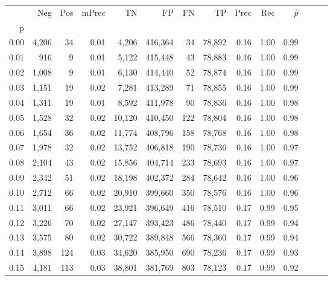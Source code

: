 \begin{tabular}{rrrrrrrrrrrrrr}
\toprule
{} &    Neg &    Pos & mPrec &       TN &       FP &      FN &      TP &  Prec &   Rec & $\hat{p}$ \\
p    &        &        &       &          &          &         &         &       &       &           \\
\midrule
0.00 &  4,206 &     34 &  0.01 &    4,206 &  416,364 &      34 &  78,892 &  0.16 &  1.00 &      0.99 \\
0.01 &    916 &      9 &  0.01 &    5,122 &  415,448 &      43 &  78,883 &  0.16 &  1.00 &      0.99 \\
0.02 &  1,008 &      9 &  0.01 &    6,130 &  414,440 &      52 &  78,874 &  0.16 &  1.00 &      0.99 \\
0.03 &  1,151 &     19 &  0.02 &    7,281 &  413,289 &      71 &  78,855 &  0.16 &  1.00 &      0.99 \\
0.04 &  1,311 &     19 &  0.01 &    8,592 &  411,978 &      90 &  78,836 &  0.16 &  1.00 &      0.98 \\
0.05 &  1,528 &     32 &  0.02 &   10,120 &  410,450 &     122 &  78,804 &  0.16 &  1.00 &      0.98 \\
0.06 &  1,654 &     36 &  0.02 &   11,774 &  408,796 &     158 &  78,768 &  0.16 &  1.00 &      0.98 \\
0.07 &  1,978 &     32 &  0.02 &   13,752 &  406,818 &     190 &  78,736 &  0.16 &  1.00 &      0.97 \\
0.08 &  2,104 &     43 &  0.02 &   15,856 &  404,714 &     233 &  78,693 &  0.16 &  1.00 &      0.97 \\
0.09 &  2,342 &     51 &  0.02 &   18,198 &  402,372 &     284 &  78,642 &  0.16 &  1.00 &      0.96 \\
0.10 &  2,712 &     66 &  0.02 &   20,910 &  399,660 &     350 &  78,576 &  0.16 &  1.00 &      0.96 \\
0.11 &  3,011 &     66 &  0.02 &   23,921 &  396,649 &     416 &  78,510 &  0.17 &  0.99 &      0.95 \\
0.12 &  3,226 &     70 &  0.02 &   27,147 &  393,423 &     486 &  78,440 &  0.17 &  0.99 &      0.94 \\
0.13 &  3,575 &     80 &  0.02 &   30,722 &  389,848 &     566 &  78,360 &  0.17 &  0.99 &      0.94 \\
0.14 &  3,898 &    124 &  0.03 &   34,620 &  385,950 &     690 &  78,236 &  0.17 &  0.99 &      0.93 \\
0.15 &  4,181 &    113 &  0.03 &   38,801 &  381,769 &     803 &  78,123 &  0.17 &  0.99 &      0.92 \\

\end{tabular}
